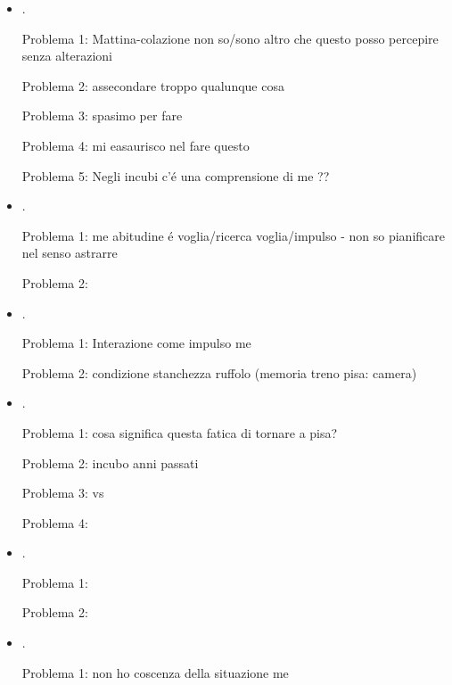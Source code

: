 \begin{itemize}
\item {}.

Problema 1: Mattina-colazione non so/sono altro che questo posso percepire  senza alterazioni

Problema 2: assecondare troppo qualunque cosa

Problema 3: spasimo per fare

Problema 4: mi easaurisco nel fare questo

Problema 5: Negli incubi c'\'e una comprensione di me ??


\item {}.

Problema 1: me abitudine \'e voglia/ricerca voglia/impulso - non so pianificare nel senso astrarre

Problema 2:

\item {}.

Problema 1: Interazione come impulso me

Problema 2: condizione stanchezza ruffolo (memoria treno pisa: camera)

\item {}.

Problema 1: cosa significa questa fatica di tornare a pisa? 

Problema 2:  incubo anni passati

Problema 3:  vs 

Problema 4:  


\item {}.

Problema 1: 

Problema 2: 

\item {}.

Problema 1: non ho coscenza della situazione me


\end{itemize}

